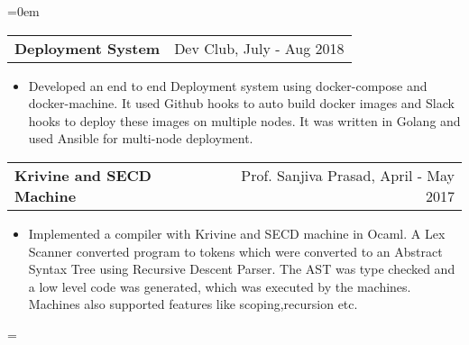 \documentclass{article}
\makeatletter
\newenvironment{longversion}{}{} %
\newenvironment{absolutelynopagebreak}
  {\par\nobreak\vfil\penalty0\vfilneg
   \vtop\bgroup}
  {\par\xdef\tpd{\the\prevdepth}\egroup
   \prevdepth=\tpd}
\newcommand{\headerrow}[2]
{\begin{tabular*}{\linewidth}{l@{\extracolsep{\fill}}r}
	#1 &
	#2 \\
\end{tabular*}}
\makeatother
\begin{document}
\begin{absolutelynopagebreak}
\begin{longversion}
\begin{list} {}{\leftmargin=0em}
\item[]
\headerrow {\textbf{Deployment System}}{Dev Club, July - Aug 2018}
\begin{itemize} \item[]
Developed an end to end Deployment system using docker-compose and docker-machine. It used Github hooks to auto build docker images and Slack hooks to deploy these images on multiple nodes. It was written in Golang and used Ansible for multi-node deployment.
\end{itemize}



\item[]
\headerrow{ \textbf{Krivine and SECD Machine}} {Prof. Sanjiva Prasad, April - May 2017}
\begin{itemize} \item[] 
Implemented a compiler with Krivine and SECD machine in Ocaml. A Lex Scanner converted program to tokens which were converted to an Abstract Syntax Tree using Recursive Descent Parser. The AST was type checked and a low level code was generated, which was executed by the machines. Machines also supported features like scoping,recursion etc.
\end{itemize}

\end{list}


\end{longversion}
\end{absolutelynopagebreak}
\end{document}
